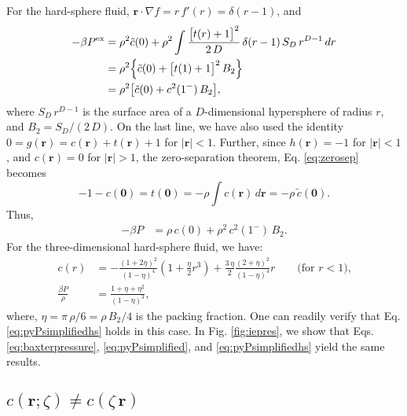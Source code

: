 \documentclass[preprint]{revtex4-1}
\newcommand{\vct}[1]{\mathbf{#1}}
\providecommand{\vr}{} %
\renewcommand{\vr}{\vct{r}}
\newcommand{\supex}[1]{ { { #1 }^{ \mathrm{ex} } } }
\newcommand{\Pex}{\supex{P}}
\begin{document}
For the hard-sphere fluid,
$\vr \cdot \nabla f = r \, f'(r) = \delta(r - 1)$, and
%
\begin{align}
  -\beta \Pex
&=
  \rho^2 \tilde{c}(0)
  +
  \rho^2 \int
    \frac{ \big[ t(r) + 1 \big]^2 }
         { 2 \, D }
  \, \delta(r - 1)
  \, S_D \, r^{D-1} \, dr
\notag
\\
&=
  \rho^2
  \Bigl\{
    \tilde{c}(0)
  +
  \big[ t(1) + 1 \big]^2 \, B_2
  \Bigr\}
\notag \\
&=
  \rho^2
  \bigl[
    \tilde{c}(0)
  +
    c^2(1^-) \, B_2
  \bigr],
\notag
\end{align}
%
where
$S_D \, r^{D-1}$ is the surface area of a $D$-dimensional hypersphere of radius $r$,
and $B_2 = S_D / (2 \, D)$.
%
On the last line, we have also used the identity
$0 = g(\vr) = c(\vr) + t(\vr) + 1$
for $|\vr| < 1$.
%
Further,
since
$h(\vr) = -1$ for $|\vr| < 1$,
and
$c(\vr) = 0$ for $|\vr| > 1$,
%
the zero-separation theorem, Eq. \eqref{eq:zerosep}
becomes\cite{henderson2009}
%
\begin{equation*}
  -1 - c(\vct 0)
=
  t(\vct 0)
=
  -\rho \int c(\vr) \, d\vr
=
  -\rho \, \tilde c(\vct 0).
\end{equation*}
%
Thus,
\begin{align}
  -\beta P
&=
  \rho \, c(0) + \rho^2 \, c^2(1^-) \, B_2.
  \label{eq:pyPsimplifiedhs}
\end{align}
%
For the three-dimensional hard-sphere fluid,
we have\cite{
wertheim1963, *wertheim1964, *thiele1963,
*baxter1968, henderson2009, hansen}:
%
%
%
\begin{align*}
c(r)
&=
-\frac{ (1 + 2\eta)^2 }
      { (1 - \eta)^4 }
  \left(1 + \frac{\eta}{2} r^3 \right)
+
\frac{ 3 \, \eta }{ 2 }
\frac{ (2 + \eta)^2 }
     { (1 - \eta)^4 }
r
\qquad
\mbox{(for $r < 1$),}
\\
\frac{ \beta P }{ \rho }
&=
\frac{ 1 + \eta + \eta^2 }
{ (1 - \eta)^3 },
\end{align*}
%
%
%
where,
$\eta = \pi \, \rho / 6 = \rho \, B_2/4$
is the packing fraction.
%
One can readily verify
that Eq. \eqref{eq:pyPsimplifiedhs} holds in this case.
%
In Fig. \ref{fig:iepres},
we show that
Eqs.
\eqref{eq:baxterpressure},
\eqref{eq:pyPsimplified},
and
\eqref{eq:pyPsimplifiedhs}
yield the same results.



\subsection{$c(\vr; \zeta) \ne c(\zeta \, \vr)$}
\end{document}
